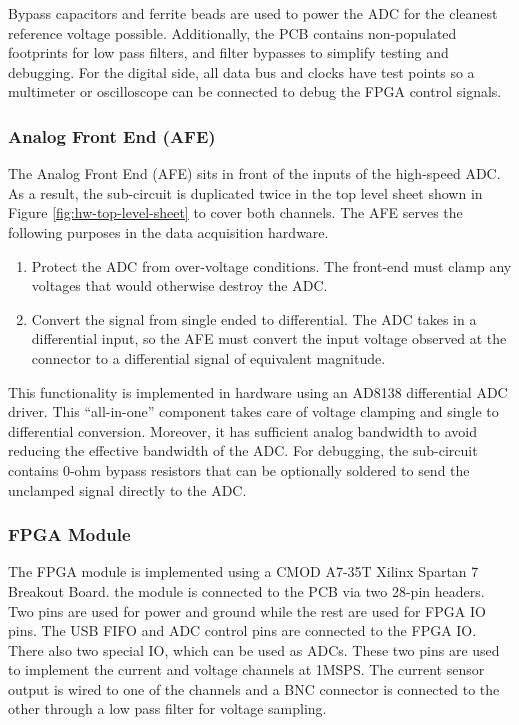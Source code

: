 \documentclass[letterpaper,11pt]{article}
\begin{document}
Bypass capacitors and ferrite beads are used to power the ADC for the cleanest
reference voltage possible. Additionally, the PCB contains non-populated
footprints for low pass filters, and filter bypasses to simplify testing and
debugging. For the digital side, all data bus and clocks have test points so a
multimeter or oscilloscope can be connected to debug the FPGA control signals.

\subsubsection{Analog Front End (AFE)}
The Analog Front End (AFE) sits in front of the inputs of the high-speed ADC. As
a result, the sub-circuit is duplicated twice in the top level sheet shown in Figure
\ref{fig:hw-top-level-sheet} to cover both channels. The AFE serves the following
purposes in the data acquisition hardware.

\begin{enumerate}
  \item Protect the ADC from over-voltage conditions. The front-end must clamp
    any voltages that would otherwise destroy the ADC.
  \item Convert the signal from single ended to differential. The ADC takes in a
    differential input, so the AFE must convert the input voltage observed at
    the connector to a differential signal of equivalent magnitude.
\end{enumerate}

This functionality is implemented in hardware using an AD8138 differential ADC
driver. This ``all-in-one'' component takes care of voltage clamping and
single to differential conversion. Moreover, it has sufficient analog bandwidth
to avoid reducing the effective bandwidth of the ADC. For debugging, the
sub-circuit contains 0-ohm bypass resistors that can be optionally soldered to
send the unclamped signal directly to the ADC.

\subsubsection{FPGA Module}
The FPGA module is implemented using a CMOD A7-35T Xilinx Spartan 7 Breakout
Board. the module is connected to the PCB via two 28-pin headers. Two pins are
used for power and ground while the rest are used for FPGA IO pins. The USB FIFO
and ADC control pins are connected to the FPGA IO. There also two special IO,
which can be used as ADCs. These two pins are used to implement the current and
voltage channels at 1MSPS. The current sensor output is wired to one of the
channels and a BNC connector is connected to the other through a low pass filter
for voltage sampling.
\end{document}
